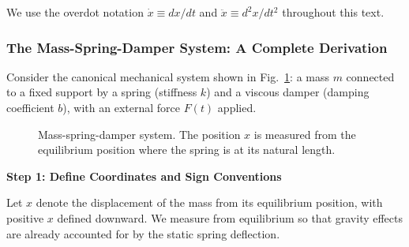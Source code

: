 We use the overdot notation $\dot{x} \equiv dx/dt$ and $\ddot{x} \equiv d^2x/dt^2$ throughout this text.

\subsubsection{The Mass-Spring-Damper System: A Complete Derivation}

Consider the canonical mechanical system shown in Fig.~\ref{fig:msd_fbd}: a mass $m$ connected to a fixed support by a spring (stiffness $k$) and a viscous damper (damping coefficient $b$), with an external force $F(t)$ applied.

\begin{figure}[htbp]
\centering
{}
\caption{Mass-spring-damper system. The position $x$ is measured from the equilibrium position where the spring is at its natural length.}
\label{fig:msd_fbd}
\end{figure}

\textbf{Step 1: Define Coordinates and Sign Conventions}

Let $x$ denote the displacement of the mass from its equilibrium position, with positive $x$ defined downward. We measure from equilibrium so that gravity effects are already accounted for by the static spring deflection.

